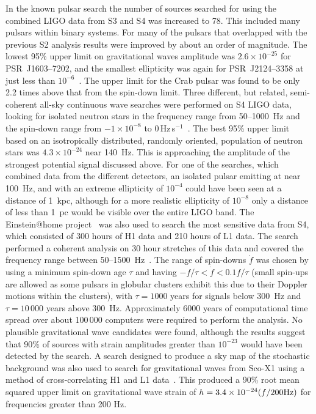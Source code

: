 \documentclass{article}
\begin{document}
In the known pulsar search the number of sources searched for using the combined
LIGO data from S3 and S4 was increased to 78. This included many pulsars within
binary systems. For many of the pulsars that overlapped with the previous S2
analysis results were improved by about an order of magnitude. The lowest 95\%
upper limit on gravitational waves amplitude was $2.6\times10^{-25}$ for
PSR~J1603--7202, and the smallest ellipticity was again for PSR~J2124--3358
at just less than $10^{-6}$~\cite{Abbott:2007d}. The upper limit for the Crab
pulsar was found to be only 2.2 times above that from the spin-down limit. Three
different, but related, semi-coherent all-sky continuous wave searches were
performed on S4 LIGO data, looking for isolated neutron stars in the frequency
range from 50--1000~Hz and the spin-down range from $-1\times10^{-8}$ to
0\,Hz\,s$^{-1}$~\cite{Abbott:2008e}. The best 95\% upper limit based on an
isotropically distributed, randomly oriented, population of neutron stars was
$4.3\times10^{-24}$ near 140~Hz. This is approaching the amplitude of the
strongest potential signal discussed above. For one of the searches, which
combined data from the different detectors, an isolated pulsar emitting at near
100~Hz, and with an extreme ellipticity of $10^{-4}$ could have been seen at a
distance of 1~kpc, although for a more realistic ellipticity of $10^{-8}$ only
a distance of less than 1~pc would be visible over the entire LIGO band. The
Einstein@home project~\cite{eath} was also used to search the most sensitive
data from S4, which consisted of 300 hours of H1 data and 210 hours of L1 data.
The search performed a coherent analysis on 30 hour stretches of this data and
covered the frequency range between 50--1500~Hz~\cite{Abbott:2008f}. The range
of spin-downs $\dot{f}$ was chosen by using a minimum spin-down age $\tau$ and
having $-f/\tau < \dot{f} < 0.1f/\tau$ (small spin-ups are allowed as some
pulsars in globular clusters exhibit this due to their Doppler motions within
the clusters), with $\tau = 1000$ years for signals below 300~Hz and $\tau =
10\,000$ years above 300~Hz. Approximately 6000 years of computational time
spread over about 100\,000 computers were required to perform the analysis. No
plausible gravitational wave candidates were found, although the results suggest
that 90\% of sources with strain amplitudes greater than $10^{-23}$ would have
been detected by the search. A search designed to produce a sky map of the
stochastic background was also used to search for gravitational waves from
Sco-X1 using a method of cross-correlating H1 and L1 data~\cite{Abbott:2007f}.
This produced a 90\% root mean squared upper limit on gravitational wave strain
of $h = 3.4\times10^{-24}(f/200 {\rm Hz})$ for frequencies greater than 200 Hz.
\end{document}
